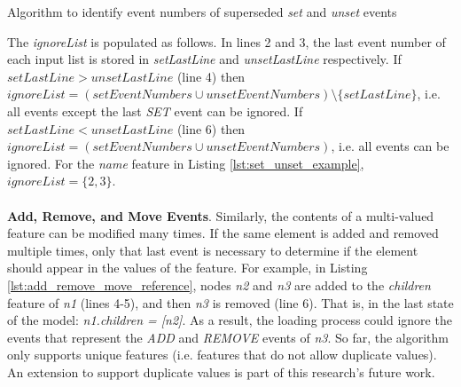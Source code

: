 \documentclass[12pt, a4paper]{report} \usepackage[titletoc]{appendix}
\begin{document}
\begin{algorithm}[H]
	\begin{small}
	\end{small}
	\caption{Algorithm to identify event numbers of superseded \emph{set} and \emph{unset} events}
	\label{alg:set_unset_optimisation}
\end{algorithm}

The \emph{ignoreList} is populated as follows.
In lines 2 and 3, the last event number of each input list is stored in \emph{setLastLine} and \emph{unsetLastLine} respectively. If $setLastLine > unsetLastLine$ (line 4) then $ignoreList = (setEventNumbers \cup unsetEventNumbers) \setminus  \{setLastLine\} $, i.e. all events except the last \emph{SET} event can be ignored. If $setLastLine < unsetLastLine$ (line 6) then $ignoreList = (setEventNumbers \cup unsetEventNumbers)$, i.e. all events can be ignored. For the \emph{name} feature in Listing \ref{lst:set_unset_example}, $ignoreList = \{2, 3\}$.
\\\\
\textbf{Add, Remove, and Move Events}\label{subsec:add_remove_and_move_operations}. Similarly, the contents of a multi-valued feature can be modified many times. If the same element is added and removed multiple times,  only that last event is necessary to determine if the element should appear in the values of the feature. For example, in Listing \ref{lst:add_remove_move_reference},  nodes \emph{n2} and \emph{n3} are added to the \emph{children} feature of \emph{n1} (lines 4-5), and then \emph{n3} is removed (line 6). That is, in the last state of the model: \emph{n1.children = [n2]}. As a result, the loading process could ignore the events that represent the \emph{ADD} and \emph{REMOVE} events of \emph{n3}. So far, the algorithm only supports unique features (i.e. features that do not allow duplicate values). An extension to support duplicate values is part of this research's future work. 
\end{document}

